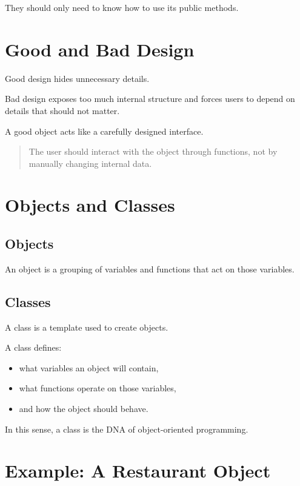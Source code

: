 \documentclass[11pt]{article}
\begin{document}
They should only need to know how to use its public methods.

\section{Good and Bad Design}

Good design hides unnecessary details.

Bad design exposes too much internal structure and forces users to depend on details that should not matter.

A good object acts like a carefully designed interface.

\begin{quote}
The user should interact with the object through functions, not by manually changing internal data.
\end{quote}

\section{Objects and Classes}

\subsection{Objects}

An object is a grouping of variables and functions that act on those variables.

\subsection{Classes}

A class is a template used to create objects.

A class defines:

\begin{itemize}
    \item what variables an object will contain,
    \item what functions operate on those variables,
    \item and how the object should behave.
\end{itemize}

In this sense, a class is the DNA of object-oriented programming.

\section{Example: A Restaurant Object}
\end{document}
